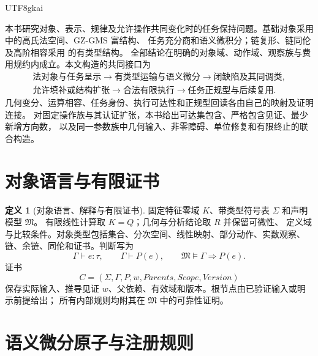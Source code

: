 \documentclass[12pt,a4paper,openany,notitlepage]{report}
\theoremstyle{plain}
\theoremstyle{definition}
\newtheorem{definition}[theorem]{定义}
\theoremstyle{remark}
\def\mathcal#1{#1}\def\mathsf#1{#1}\def\mathbb#1{#1}%
\begin{document}
\begin{CJK*}{UTF8}{gkai}
\label{hgov:chapter}

本书研究对象、表示、规律及允许操作共同变化时的任务保持问题。基础对象采用
\cite{GFrameworkSynthesis,S01,S38} 中的高氏法空间、GZ-GMS 富结构、
任务充分商和语义微积分；链复形、链同伦及高阶相容采用
\cite{ExtHatcher,ExtWeibel,ExtStacks,ExtLadaMarkl} 的有类型结构。
全部结论在明确的对象域、动作域、观察族与费用规约内成立。本文构造的共同接口为
\begin{equation}
\label{hgov:eq:spine}
\begin{gathered}
\text{法对象与任务呈示}\longrightarrow
\text{有类型运输与语义微分}\longrightarrow
\text{闭缺陷及其同调类},\\
\text{允许填补或结构扩张}\longrightarrow
\text{合法有限执行}\longrightarrow
\text{任务正规型与后续复用}.
\end{gathered}
\end{equation}
几何变分、运算相容、任务身份、执行可达性和正规型回读各由自己的映射及证明连接。
对固定操作族与其认证扩张，本书给出可达集包含、严格包含见证、最少新增方向数，
以及同一参数族中几何输入、非零障碍、单位修复和有限终止的联合构造。


\label{hgov:sec:atoms}

\section{对象语言与有限证书}

\begin{definition}[对象语言、解释与有限证书]
\label{hgov:def:language}
固定特征零域 $\mathbb K$、带类型符号表 $\Sigma$ 和声明模型 $\mathfrak M$。
有限线性计算取 $\mathbb K=\mathbb Q$；几何与分析结论取 $\mathbb R$ 并保留可微性、
定义域与比较条件。对象类型包括集合、分次空间、线性映射、部分动作、实数观察、
链、余链、同伦和证书。判断写为
\[
\Gamma\vdash e:\tau,\qquad \Gamma\vdash P(e),\qquad
\mathfrak M\models\Gamma\Rightarrow P(e).
\]
证书
\[
\mathcal C=(\Sigma,\Gamma,P,w,\mathsf{Parents},\mathsf{Scope},\mathsf{Version})
\]
保存实际输入、推导见证 $w$、父依赖、有效域和版本。根节点由已验证输入或明示前提给出；
所有内部规则均附其在 $\mathfrak M$ 中的可靠性证明。
\end{definition}

\section{语义微分原子与注册规则}


\end{CJK*}
\end{document}
